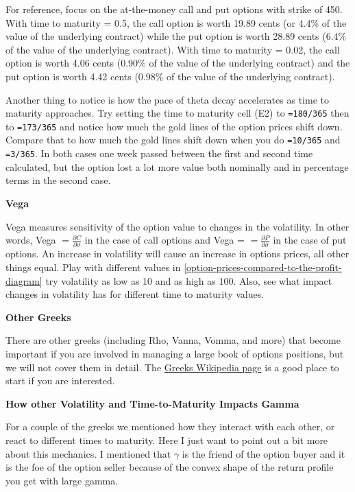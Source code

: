 \documentclass[
]{book}
\begin{document}
For reference, focus on the at-the-money call and put options with strike of 450. With time to maturity = 0.5, the call option is worth 19.89 cents (or 4.4\% of the value of the underlying contract) while the put option is worth 28.89 cents (6.4\% of the value of the underlying contract). With time to maturity = 0.02, the call option is worth 4.06 cents (0.90\% of the value of the underlying contract) and the put option is worth 4.42 cents (0.98\% of the value of the underlying contract).

Another thing to notice is how the pace of theta decay accelerates as time to maturity approaches. Try setting the time to maturity cell (E2) to \texttt{=180/365} then to \texttt{=173/365} and notice how much the gold lines of the option prices shift down. Compare that to how much the gold lines shift down when you do \texttt{=10/365} and \texttt{=3/365}. In both cases one week passed between the first and second time calculated, but the option lost a lot more value both nominally and in percentage terms in the second case.

\textbf{Vega}

Vega measures sensitivity of the option value to changes in the volatility. In other words, Vega \(= \frac{\partial C}{\partial \sigma}\) in the case of call options and Vega = \(= \frac{\partial P}{\partial \sigma}\) in the case of put options. An increase in volatility will cause an increase in options prices, all other things equal. Play with different values in \ref{option-prices-compared-to-the-profit-diagram} try volatility as low as 10 and as high as 100. Also, see what impact changes in volatility has for different time to maturity values.

\textbf{Other Greeks}

There are other greeks (including Rho, Vanna, Vomma, and more) that become important if you are involved in managing a large book of options positions, but we will not cover them in detail. The \href{https://en.wikipedia.org/wiki/Greeks_(finance)}{Greeks Wikipedia page} is a good place to start if you are interested.

\textbf{How other Volatility and Time-to-Maturity Impacts Gamma}

For a couple of the greeks we mentioned how they interact with each other, or react to different times to maturity. Here I just want to point out a bit more about this mechanics. I mentioned that \(\gamma\) is the friend of the option buyer and it is the foe of the option seller because of the convex shape of the return profile you get with large gamma.
\end{document}
